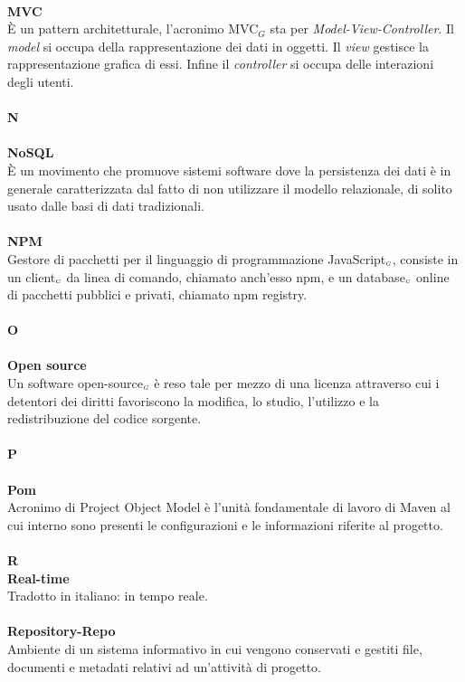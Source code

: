 \\
\textbf{MVC}\\
È un pattern architetturale, l'acronimo MVC$_G$ sta per \textit{Model-View-Controller}.
Il \textit{model} si occupa della rappresentazione dei dati in oggetti.
Il \textit{view} gestisce la rappresentazione grafica di essi.
Infine il \textit{controller} si occupa delle interazioni degli utenti.\\
\\
\textbf{N}\\
\\
\textbf{NoSQL}\\
 È un movimento che promuove sistemi software dove la persistenza dei dati è in generale caratterizzata dal fatto di non utilizzare il modello relazionale, di solito usato dalle basi di dati tradizionali.\\
\\
\textbf{NPM}\\
Gestore di pacchetti per il linguaggio di programmazione JavaScript$_{\scaleto{G}{3pt}}$, consiste in un client$_{\scaleto{G}{3pt}}$ da linea di comando, chiamato anch'esso npm, e un database$_{\scaleto{G}{3pt}}$ online di pacchetti pubblici e privati, chiamato npm registry.\\
\\
\textbf{O}\\
\\
\textbf{Open source}\\
Un software open-source$_{\scaleto{G}{3pt}}$ è reso tale per mezzo di una licenza attraverso cui i detentori dei diritti favoriscono la modifica, lo studio, l'utilizzo e la redistribuzione del codice sorgente.\\
\\
\textbf{P}\\
\\
\textbf{Pom}\\
Acronimo di Project Object Model è l'unità fondamentale di lavoro di Maven al cui interno sono presenti le configurazioni e le informazioni riferite al progetto.\\
\\
\textbf{R}
\\
\textbf{Real-time}\\
Tradotto in italiano: in tempo reale.\\
\\
\textbf{Repository-Repo}\\
Ambiente di un sistema informativo in cui vengono conservati e gestiti file, documenti e metadati relativi ad un’attività di progetto.\\
